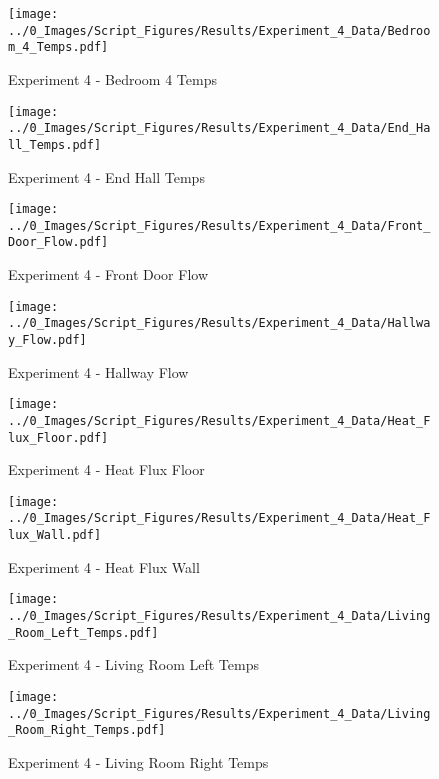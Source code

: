 	\clearpage

	\begin{figure}[H]
		\centering
		\texttt{[image: ../0\_Images/Script\_Figures/Results/Experiment\_4\_Data/Bedroom\_4\_Temps.pdf]}
		\caption[]{Experiment 4 - Bedroom 4 Temps}
	\end{figure}
 

	\begin{figure}[H]
		\centering
		\texttt{[image: ../0\_Images/Script\_Figures/Results/Experiment\_4\_Data/End\_Hall\_Temps.pdf]}
		\caption[]{Experiment 4 - End Hall Temps}
	\end{figure}
 
	\clearpage

	\begin{figure}[H]
		\centering
		\texttt{[image: ../0\_Images/Script\_Figures/Results/Experiment\_4\_Data/Front\_Door\_Flow.pdf]}
		\caption[]{Experiment 4 - Front Door Flow}
	\end{figure}
 

	\begin{figure}[H]
		\centering
		\texttt{[image: ../0\_Images/Script\_Figures/Results/Experiment\_4\_Data/Hallway\_Flow.pdf]}
		\caption[]{Experiment 4 - Hallway Flow}
	\end{figure}
 
	\clearpage

	\begin{figure}[H]
		\centering
		\texttt{[image: ../0\_Images/Script\_Figures/Results/Experiment\_4\_Data/Heat\_Flux\_Floor.pdf]}
		\caption[]{Experiment 4 - Heat Flux Floor}
	\end{figure}
 

	\begin{figure}[H]
		\centering
		\texttt{[image: ../0\_Images/Script\_Figures/Results/Experiment\_4\_Data/Heat\_Flux\_Wall.pdf]}
		\caption[]{Experiment 4 - Heat Flux Wall}
	\end{figure}
 
	\clearpage

	\begin{figure}[H]
		\centering
		\texttt{[image: ../0\_Images/Script\_Figures/Results/Experiment\_4\_Data/Living\_Room\_Left\_Temps.pdf]}
		\caption[]{Experiment 4 - Living Room Left Temps}
	\end{figure}
 

	\begin{figure}[H]
		\centering
		\texttt{[image: ../0\_Images/Script\_Figures/Results/Experiment\_4\_Data/Living\_Room\_Right\_Temps.pdf]}
		\caption[]{Experiment 4 - Living Room Right Temps}
	\end{figure}
 
